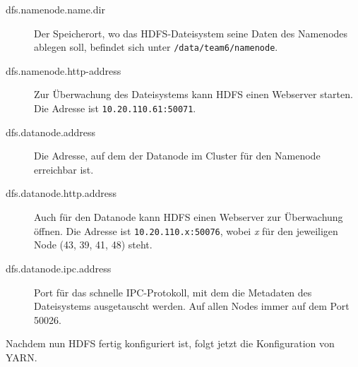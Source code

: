 \begin{description}
	\item[dfs.namenode.name.dir] Der Speicherort, wo das HDFS-Dateisystem seine Daten des Namenodes ablegen soll, befindet sich unter
	\texttt{/data/team6/namenode}.
	\item[dfs.namenode.http-address] Zur Überwachung des Dateisystems kann HDFS einen Webserver starten. Die Adresse ist 
	\texttt{10.20.110.61:50071}.
	\item[dfs.datanode.address] Die Adresse, auf dem der Datanode im Cluster für den Namenode erreichbar ist.
	\item[dfs.datanode.http.address] Auch für den Datanode kann HDFS einen Webserver zur Überwachung öffnen. Die Adresse ist
	\texttt{10.20.110.x:50076}, wobei \textit{x} für den jeweiligen Node (43, 39, 41, 48) steht.
	\item[dfs.datanode.ipc.address] Port für das schnelle IPC-Protokoll, mit dem die Metadaten des Dateisystems ausgetauscht werden.
	Auf allen Nodes immer auf dem Port 50026.
\end{description}

Nachdem nun HDFS fertig konfiguriert ist, folgt jetzt die Konfiguration von YARN.
\lstset{basicstyle=\small}


